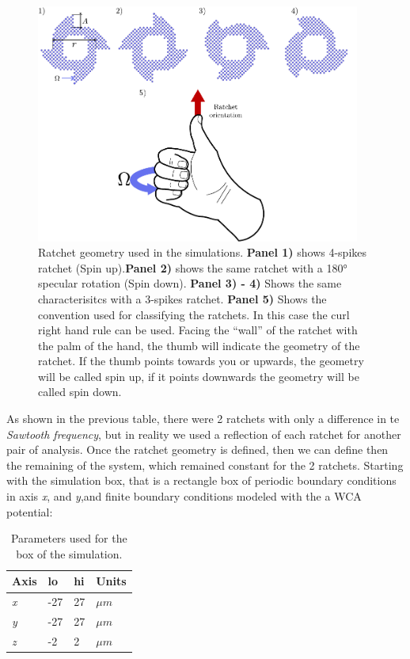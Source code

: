 \begin{figure}
  \begin{center}
    \includegraphics[width=0.95\textwidth]{figures/ratchet.pdf}
  \end{center}
  \caption[Ratchet geomety.]{Ratchet geometry used in the simulations. \textbf{Panel 1)} shows 4-spikes ratchet (Spin up).\textbf{Panel 2)} shows the same ratchet with a 180° specular rotation (Spin down). \textbf{Panel 3) - 4)} Shows the same characterisitcs with a 3-spikes ratchet. \textbf{ Panel 5)} Shows the convention used for classifying the ratchets. In this case the curl right hand rule can be used. Facing the ``wall'' of the ratchet with the palm of the hand, the thumb will indicate the geometry of the ratchet. If the thumb points towards you or upwards, the geometry will be called spin up, if it points downwards the geometry will be called spin down.}\label{fig:ratchetgeometry}
\end{figure}


As shown in the previous table, there were 2 ratchets with only a difference in te \textit{Sawtooth frequency}, but in reality we used a reflection of each ratchet for another pair of analysis. Once the ratchet geometry is defined, then we can define then the remaining of the system, which remained constant for the 2 ratchets. Starting with the simulation box, that is a rectangle box of periodic boundary conditions in axis \textit{x}, and \textit{y},and finite boundary conditions modeled with the a WCA potential:



\begin{table}[H]
\centering
\caption[Simulation box physical parameters.]{Parameters used for the box of the simulation.}
\begin{tabular}{l l l l}
\hline
Axis & lo  & hi & Units \\
\hline
\textit{x} & -27 & 27 & \( \mu m\) \\
\textit{y} & -27 & 27 & \( \mu m\) \\
\textit{z} & -2  & 2   & \( \mu m\)\\ 
\hline
\end{tabular}
\end{table}

